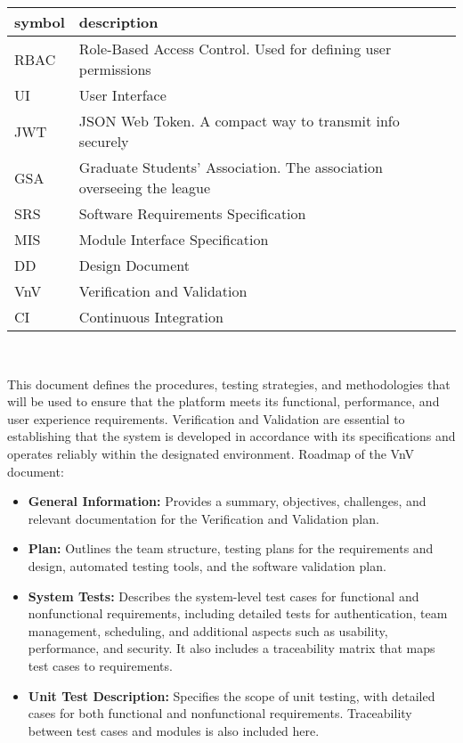 \documentclass[12pt, titlepage]{article}
\begin{document}
\renewcommand{\arraystretch}{1.2}
\begin{tabular}{l l}
    \toprule
    \textbf{symbol} & \textbf{description}                                                  \\
    \midrule
    RBAC            & Role-Based Access Control. Used for defining user permissions         \\
    UI              & User Interface                                                        \\
    JWT             & JSON Web Token. A compact way to transmit info securely               \\
    GSA             & Graduate Students' Association. The association overseeing the league \\
    SRS             & Software Requirements Specification                                   \\
    MIS             & Module Interface Specification                                        \\
    DD              & Design Document                                                       \\
    VnV             & Verification and Validation                                           \\
    CI              & Continuous Integration                                                \\
    \bottomrule
\end{tabular}\\

\newpage


This document defines the procedures, testing strategies, and methodologies that will be used to ensure that the platform meets its functional, performance, and user experience requirements. Verification and Validation are essential to establishing that the system is developed in accordance with its specifications and operates reliably within the designated environment.
Roadmap of the VnV document:
\begin{itemize}
    \item \textbf{General Information:} Provides a summary, objectives, challenges, and relevant documentation for the Verification and Validation plan.
    \item \textbf{Plan:} Outlines the team structure, testing plans for the requirements and design, automated testing tools, and the software validation plan.
    \item \textbf{System Tests:} Describes the system-level test cases for functional and nonfunctional requirements, including detailed tests for authentication, team management, scheduling, and additional aspects such as usability, performance, and security. It also includes a traceability matrix that maps test cases to requirements.
    \item \textbf{Unit Test Description:} Specifies the scope of unit testing, with detailed cases for both functional and nonfunctional requirements. Traceability between test cases and modules is also included here.
\end{itemize}
\end{document}
